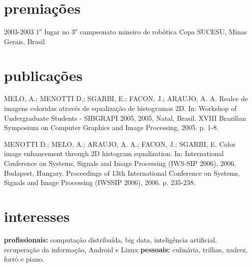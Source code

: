 \documentclass[]{friggeri-cv}
\begin{document}
\section{premiações}



\begin{entrylist}

\entry
{2003-2003} 
{$1^{o}$ lugar {\normalfont no $3^{o}$ campeonato mineiro de robótica}}
{Copa SUCESU, Minas Gerais, Brasil}


\end{entrylist}



\section{publicações}

MELO, A.; MENOTTI D.; SGARBI, E.; FACON, J.; ARAUJO, A. A. Realce de imagens coloridas através de equalização de histogramas 2D. In: Workshop of Undergraduate Students - SIBGRAPI 2005, 2005, Natal, Brasil. XVIII Brazilian Symposium on Computer Graphics and Image Processing, 2005. p. 1-8.

MENOTTI D.; MELO, A.; ARAUJO, A. A.; FACON, J.; SGARBI, E. Color image enhancement through 2D histogram equalization. In: International Conference on Systems, Signals and Image Processing (IWS-SIP 2006), 2006, Budapest, Hungary. Proceedings of 13th International Conference on Systems, Signals and Image Processing (IWSSIP 2006), 2006. p. 235-238.

\section{interesses}

\textbf{profissionais:} computação distribuída, big data, inteligência artificial, recuperação da informação, Android e Linux \textbf{pessoais:} culinária, trilhas,  xadrez, forró e piano.
\end{document}
